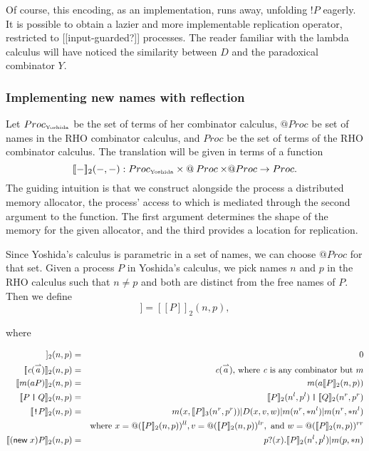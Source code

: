 \documentclass{llncs}
\makeatletter
\newcommand{\new}{\mathsf{new}}
\newcommand{\ldb}{[\![}
\newcommand{\rdb}{]\!]}
\newcommand{\id}[1]{\texttt{#1}}
\newcommand{\pzero}{\mathbin{0}}
\newcommand{\juxtap}{\mathbin{\id{|}}}
\newcommand{\binpar}[2]{#1 | #2}
\newcommand{\prefix}[3]{#1?(#2) . #3}
\newcommand{\quotep}[1]{\mathsf{@}#1}
\newcommand{\bangp}[1]{! #1}
\newcommand{\meaningof}[1]{\ldb #1 \rdb}
\newcommand{\Proc}{\mathbin{Proc}}
\newcommand{\QProc}{\quotep{\mathbin{Proc}}}
\newcommand{\red}{\rightarrow}
\newcommand{\vect}[1]{\stackrel{\rightharpoonup}{#1}}
\makeatother
\begin{document}
Of course, this encoding, as an implementation, runs away, unfolding
$\bangp{P}$ eagerly. It is possible to obtain a lazier and more
implementable replication operator, restricted to [[input-guarded?]]
processes.  The reader familiar with the lambda calculus will have noticed the
similarity between $D$ and the paradoxical combinator $Y$.

\subsubsection{Implementing new names with reflection}

Let $\Proc_{\mbox{\tiny Yoshida}}$ be the set of terms of her combinator calculus, $\QProc$ be set of names in the RHO combinator calculus, and $\Proc$ be the set of terms of the RHO combinator calculus.  The translation will be given in terms of a function
\[\meaningof{-}_2( -, - ) : 
    \Proc_{\mbox{\tiny Yoshida}} \times \QProc {\times} \QProc \red \Proc.\] 
The guiding intuition is that we construct alongside the process a distributed memory
allocator, the process' access to which is mediated through the second argument
to the function. The first argument determines the shape of the memory
for the given allocator, and the third provides a location for replication.

Since Yoshida's calculus is parametric in a set of names, we can choose $\QProc$ for that set.  Given a process $P$ in Yoshida's calculus, 
we pick names $n$ and $p$ in the RHO calculus such that $n \neq p$ and
both are distinct from the free names of $P$.  Then we define
\begin{equation*}
  \meaningof{P} = \meaningof{P}_2(n, p),
\end{equation*}

where

\begin{eqnarray*}
    \meaningof{\pzero}_2 (n,p)
      & = &
       \pzero \\
    \meaningof{\emph{c}(\vect{a})}_2 (n,p) 
      & = & 
      \emph{c}(\vect{a})\mbox{, where $\emph{c}$ is any combinator but $m$} \\
    \meaningof{m(aP)}_2 (n,p) 
      & = & 
          m(a \meaningof{P}_2 (n,p)) \\
    \meaningof{P \juxtap Q}_2 (n,p) 
      & = & 
    \meaningof{P}_2 (n^l, p^l)
         \juxtap \meaningof{Q}_2 (n^r, p^r) \\ 
    \meaningof{\id{!} P}_2 (n,p)
          & = & \binpar{m(x, \meaningof{P}_3(n^r,p^r))}
                  {\binpar{D(x,v,w)}
                    {\binpar{m(n^r, *n^l)}{m(n^r, *n^l)}}} \\
                  & & \mbox{where } 
                      x = @(\meaningof{P}_2(n,p))^{ll}, 
                      v = @(\meaningof{P}_2(n,p))^{lr}, \mbox{ and }
                      w = @(\meaningof{P}_2(n,p))^{rr} \\
    \meaningof{(\new \; x ) P}_2 (n, p) 
          & = & 
         \prefix{p}{x}{\binpar{\meaningof{P}_2 ( n^l, p^l )}{m(p, *n)}} 
\end{eqnarray*}
\end{document}
